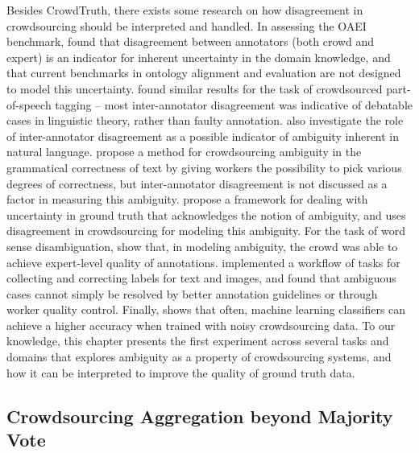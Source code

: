 Besides CrowdTruth, there exists some research on how disagreement in crowdsourcing should be interpreted and handled. In assessing the OAEI benchmark, \cite{cheatham2014conference} found that disagreement between annotators (both crowd and expert) is an indicator for inherent uncertainty in the domain knowledge, and that current benchmarks in ontology alignment and evaluation are not designed to model this uncertainty. \cite{plank-hovy-sogaard:2014:P14-2} found similar results for the task of crowdsourced part-of-speech tagging -- most inter-annotator disagreement was indicative of debatable cases in linguistic theory, rather than faulty annotation. \cite{Bayerl2011} also investigate the role of inter-annotator disagreement as a possible indicator of ambiguity inherent in natural language. \cite{lau2014measuring} propose a method for crowdsourcing ambiguity in the grammatical correctness of text by giving workers the possibility to pick various degrees of correctness, but inter-annotator disagreement is not discussed as a factor in measuring this ambiguity. \cite{schaekermann2016} propose a framework for dealing with uncertainty in ground truth that acknowledges the notion of ambiguity, and uses disagreement in crowdsourcing for modeling this ambiguity. For the task of word sense disambiguation, \cite{jurgens2013embracing} show that, in modeling ambiguity, the crowd was able to achieve expert-level quality of annotations. \cite{Chang:2017:Revolt} implemented a workflow of tasks for collecting and correcting labels for text and images, and found that ambiguous cases cannot simply be resolved by better annotation guidelines or through worker quality control. Finally, \cite{lin2014re} shows that often, machine learning classifiers can achieve a higher accuracy when trained with noisy crowdsourcing data. To our knowledge, this chapter presents the first experiment across several tasks and domains that explores ambiguity as a property of crowdsourcing systems, and how it can be interpreted to improve the quality of ground truth data.


\subsection{Crowdsourcing Aggregation beyond Majority Vote}

